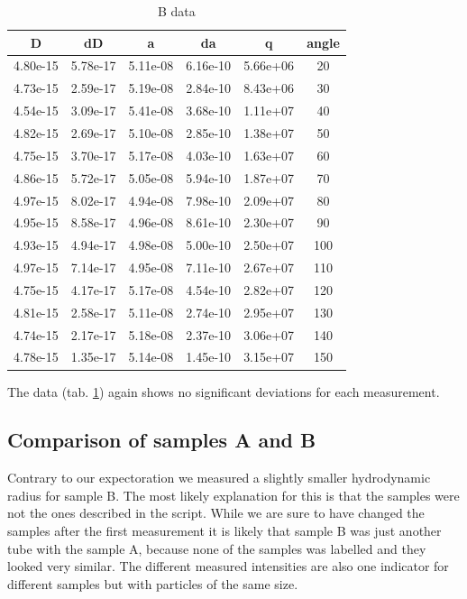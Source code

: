 \documentclass[]{article}
\begin{document}
\begin{table}[!htbp]
	\centering
	\begin{tabular}{|c|c|c|c|c|c|}
		\hline
		D & dD & a & da & q & angle \\ \hline\hline
		4.80e-15 & 5.78e-17 & 5.11e-08 & 6.16e-10 & 5.66e+06 & 20 \\ \hline
		4.73e-15 & 2.59e-17 & 5.19e-08 & 2.84e-10 & 8.43e+06 & 30 \\ \hline
		4.54e-15 & 3.09e-17 & 5.41e-08 & 3.68e-10 & 1.11e+07 & 40 \\ \hline
		4.82e-15 & 2.69e-17 & 5.10e-08 & 2.85e-10 & 1.38e+07 & 50 \\ \hline
		4.75e-15 & 3.70e-17 & 5.17e-08 & 4.03e-10 & 1.63e+07 & 60 \\ \hline
		4.86e-15 & 5.72e-17 & 5.05e-08 & 5.94e-10 & 1.87e+07 & 70 \\ \hline
		4.97e-15 & 8.02e-17 & 4.94e-08 & 7.98e-10 & 2.09e+07 & 80 \\ \hline
		4.95e-15 & 8.58e-17 & 4.96e-08 & 8.61e-10 & 2.30e+07 & 90 \\ \hline
		4.93e-15 & 4.94e-17 & 4.98e-08 & 5.00e-10 & 2.50e+07 & 100 \\ \hline
		4.97e-15 & 7.14e-17 & 4.95e-08 & 7.11e-10 & 2.67e+07 & 110 \\ \hline
		4.75e-15 & 4.17e-17 & 5.17e-08 & 4.54e-10 & 2.82e+07 & 120 \\ \hline
		4.81e-15 & 2.58e-17 & 5.11e-08 & 2.74e-10 & 2.95e+07 & 130 \\ \hline
		4.74e-15 & 2.17e-17 & 5.18e-08 & 2.37e-10 & 3.06e+07 & 140 \\ \hline
		4.78e-15 & 1.35e-17 & 5.14e-08 & 1.45e-10 & 3.15e+07 & 150 \\ \hline
		\hline
	\end{tabular}
	\caption{B data}
	\label{tab:bdata}
\end{table}
The data (tab. \ref{tab:bdata}) again shows no significant deviations for each measurement.

\subsection{Comparison of samples A and B}
Contrary to our expectoration we measured a slightly smaller hydrodynamic radius for sample B. The most likely explanation for this is that the samples were not the ones described in the script. While we are sure to have changed the samples after the first measurement it is likely that sample B was just another tube with the sample A, because none of the samples was labelled and they looked very similar. The different measured intensities are also one indicator for different samples but with particles of the same size.
\end{document}
